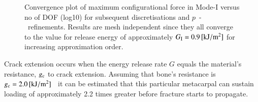 \documentclass[11pt]{acmeArticle}
\numberwithin{equation}{section}
\begin{document}
\begin{figure}
	\centering
	
	\caption{Convergence plot of maximum configurational force in Mode-I versus no of DOF (log10) for subsequent discretisations and $p$~-~refinements. Results are mesh independent since they all converge to the value for release energy of approximately $ G_{\rm I} = 0.9 \, [\mathrm{kJ} / \mathrm{m}^2]$ for increasing approximation order. }
	\label{fig:max_g1_convergece}
\end{figure}
Crack extension occurs when the energy release rate $G$ equals the material's resistance, $g_{\rm c}$ to crack extension. 
Assuming that bone's resistance is $g_{\rm c} = 2.0\,[\mathrm{ kJ/m^2}]$~\citep{gasser2007numerical} it can be estimated that this particular metacarpal can sustain loading of approximately 2.2 times greater before fracture starts to propagate. 
\end{document}
